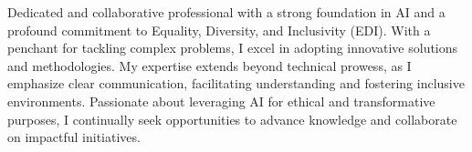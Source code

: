 
\begin{cvparagraph}

Dedicated and collaborative professional with a strong foundation in AI and a profound commitment to Equality, Diversity, and Inclusivity (EDI). With a penchant for tackling complex problems, I excel in adopting innovative solutions and methodologies. My expertise extends beyond technical prowess, as I emphasize clear communication, facilitating understanding and fostering inclusive environments. Passionate about leveraging AI for ethical and transformative purposes, I continually seek opportunities to advance knowledge and collaborate on impactful initiatives.

\end{cvparagraph}
